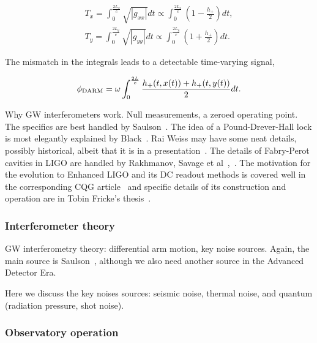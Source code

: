 \begin{eqnarray}
T_x = \int_0^{\frac{2L_x}{c}} \sqrt{|g_{xx}|} dt \propto \int_0^{\frac{2L_x}{c}} \left(1 - \frac{h_+}{2} \right) dt, \\
T_y = \int_0^{\frac{2L_y}{c}} \sqrt{|g_{yy}|} dt \propto \int_0^{\frac{2L_y}{c}} \left(1 + \frac{h_+}{2} \right) dt.
\end{eqnarray}

\noindent The mismatch in the integrals leads to a detectable time-varying signal,

\begin{equation}
\phi_{\textup{DARM}} = \omega \int_0^{\frac{2L}{c}} \frac{h_+ (t, x(t)) + h_+ (t, y(t))}{2} dt.
\end{equation}  



            Why GW interferometers work. Null measurements, a zeroed operating point. The specifics are best handled by Saulson~\cite{Saulson}. The idea of a Pound-Drever-Hall lock is most elegantly explained by Black~\cite{PDHNotes}. Rai Weiss may have some neat details, possibly historical, albeit that it is in a presentation~\cite{LIGOWorks}. The details of Fabry-Perot cavities in LIGO are handled by Rakhmanov, Savage et al~\cite{ResonanceFP},~\cite{ResponsesFP}. The motivation for the evolution to Enhanced LIGO and its DC readout methods is covered well in the corresponding CQG article~\cite{Fricke2009} and specific details of its construction and operation are in Tobin Fricke's thesis~\cite{FrickeThesis}.

            \subsubsection{Interferometer theory}
            \label{interferometer_theory}
        
                GW interferometry theory: differential arm motion, key noise sources. Again, the main source is Saulson~\cite{Saulson}, although we also need another source in the Advanced Detector Era.

                Here we discuss the key noises sources: seismic noise, thermal noise, and quantum (radiation pressure, shot noise).

            \subsubsection{Observatory operation}
            \label{observatory_operation}


